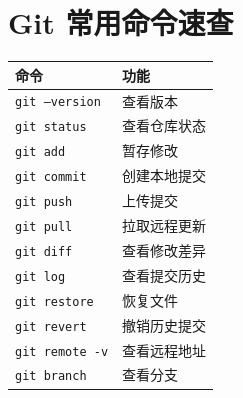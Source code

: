 



\section{Git 常用命令速查}



\begin{center}

\small

\begin{tabular}{ll}

\hline

命令 & 功能 \\

\hline

\texttt{git --version} & 查看版本 \\

\texttt{git status} & 查看仓库状态 \\

\texttt{git add} & 暂存修改 \\

\texttt{git commit} & 创建本地提交 \\

\texttt{git push} & 上传提交 \\

\texttt{git pull} & 拉取远程更新 \\

\texttt{git diff} & 查看修改差异 \\

\texttt{git log} & 查看提交历史 \\

\texttt{git restore} & 恢复文件 \\

\texttt{git revert} & 撤销历史提交 \\

\texttt{git remote -v} & 查看远程地址 \\

\texttt{git branch} & 查看分支 \\

\hline

\end{tabular}

\end{center}






